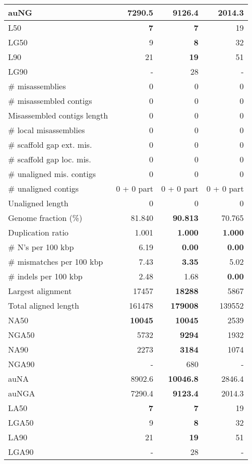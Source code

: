 \documentclass[12pt,a4paper]{article}
\begin{document}
\begin{table}[ht]
\begin{center}
\begin{tabular}{|l*{3}{|r}|}
auNG & 7290.5 & {\bf 9126.4} & 2014.3 \\ \hline
L50 & {\bf 7} & {\bf 7} & 19 \\ \hline
LG50 & 9 & {\bf 8} & 32 \\ \hline
L90 & 21 & {\bf 19} & 51 \\ \hline
LG90 & - & 28 & - \\ \hline
\# misassemblies & 0 & 0 & 0 \\ \hline
\# misassembled contigs & 0 & 0 & 0 \\ \hline
Misassembled contigs length & 0 & 0 & 0 \\ \hline
\# local misassemblies & 0 & 0 & 0 \\ \hline
\# scaffold gap ext. mis. & 0 & 0 & 0 \\ \hline
\# scaffold gap loc. mis. & 0 & 0 & 0 \\ \hline
\# unaligned mis. contigs & 0 & 0 & 0 \\ \hline
\# unaligned contigs & 0 + 0 part & 0 + 0 part & 0 + 0 part \\ \hline
Unaligned length & 0 & 0 & 0 \\ \hline
Genome fraction (\%) & 81.840 & {\bf 90.813} & 70.765 \\ \hline
Duplication ratio & 1.001 & {\bf 1.000} & {\bf 1.000} \\ \hline
\# N's per 100 kbp & 6.19 & {\bf 0.00} & {\bf 0.00} \\ \hline
\# mismatches per 100 kbp & 7.43 & {\bf 3.35} & 5.02 \\ \hline
\# indels per 100 kbp & 2.48 & 1.68 & {\bf 0.00} \\ \hline
Largest alignment & 17457 & {\bf 18288} & 5867 \\ \hline
Total aligned length & 161478 & {\bf 179008} & 139552 \\ \hline
NA50 & {\bf 10045} & {\bf 10045} & 2539 \\ \hline
NGA50 & 5732 & {\bf 9294} & 1932 \\ \hline
NA90 & 2273 & {\bf 3184} & 1074 \\ \hline
NGA90 & - & 680 & - \\ \hline
auNA & 8902.6 & {\bf 10046.8} & 2846.4 \\ \hline
auNGA & 7290.4 & {\bf 9123.4} & 2014.3 \\ \hline
LA50 & {\bf 7} & {\bf 7} & 19 \\ \hline
LGA50 & 9 & {\bf 8} & 32 \\ \hline
LA90 & 21 & {\bf 19} & 51 \\ \hline
LGA90 & - & 28 & - \\ \hline
\end{tabular}
\end{center}
\end{table}
\end{document}
